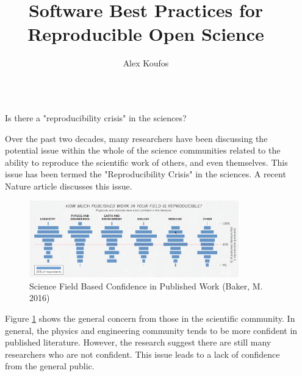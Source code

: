 \documentclass[final]{beamer}
\title{Software Best Practices for Reproducible Open Science}
\author{Alex Koufos \inst{1}} %
\institute[shortinst]{\inst{1} Stanford University}
\newlength{\sepwidth}
\newlength{\colwidth}
\newcommand{\separatorcolumn}{\begin{column}{\sepwidth}\end{column}}
\begin{document}
\begin{frame}[t]
\begin{columns}[t]
\separatorcolumn

\begin{column}{\colwidth}

  \begin{block}{Is there a "reproducibility crisis" in the sciences?}

    Over the past two decades, many researchers have been discussing the
    potential issue within the whole of the science communities related to the
    ability to reproduce the scientific work of others, and even themselves.
    This issue has been termed the "Reproducibility Crisis" in the sciences.
    A recent Nature article\cite{baker2016} discusses this issue.
       
    \begin{figure}
      \centering
      \includegraphics[width=0.85\textwidth]{tess2024/Nature-Field-Confidence.png}
      \caption{Science Field Based Confidence in Published Work (Baker, M. 2016)}
      \label{fig:confidence}
    \end{figure}

    Figure \ref*{fig:confidence} shows the general concern from those in the
    scientific community.
    In general, the physics and engineering community tends to be more
    confident in published literature.
    However, the research suggest there are still many researchers who are not
    confident.
    This issue leads to a lack of confidence from the general public.


\end{block}
\end{column}
\end{columns}
\end{frame}
\end{document}
